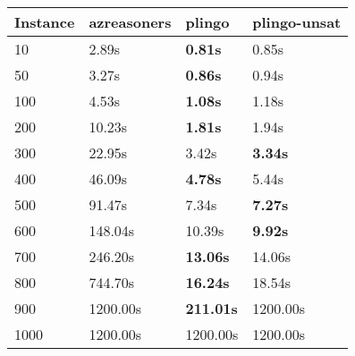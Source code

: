 \begin{tabular}{|l|l|l|l|}
\toprule
\textbf{Instance} & \textbf{azreasoners} &  \textbf{plingo} & \textbf{plingo-unsat} \\
\midrule
               10 &                2.89s &   \textbf{0.81s} &                 0.85s \\
               50 &                3.27s &   \textbf{0.86s} &                 0.94s \\
              100 &                4.53s &   \textbf{1.08s} &                 1.18s \\
              200 &               10.23s &   \textbf{1.81s} &                 1.94s \\
              300 &               22.95s &            3.42s &        \textbf{3.34s} \\
              400 &               46.09s &   \textbf{4.78s} &                 5.44s \\
              500 &               91.47s &            7.34s &        \textbf{7.27s} \\
              600 &              148.04s &           10.39s &        \textbf{9.92s} \\
              700 &              246.20s &  \textbf{13.06s} &                14.06s \\
              800 &              744.70s &  \textbf{16.24s} &                18.54s \\
              900 &             1200.00s & \textbf{211.01s} &              1200.00s \\
             1000 &             1200.00s &         1200.00s &              1200.00s \\
\bottomrule
\end{tabular}
